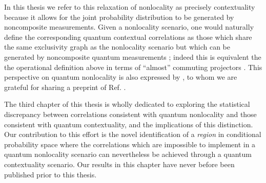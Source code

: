 \documentclass[
  12pt          %
  ,letterpaper  %
  ,center       %
  ,noupper      %
  ,english,fleqn]{uconnthesis}
\begin{document}
In this thesis we refer to this relaxation of nonlocality as precisely contextuality because it allows for the joint probability distribution to be generated by noncomposite measurements. Given a nonlocality scenario, one would naturally define the corresponding quantum contextual correlations as those which share the same exclusivity graph as the nonlocality scenario but which can be generated by noncomposite quantum measurements \cite[Proposition 6.3.1.d]{FritzCombinatorialLong}; indeed this is equivalent the the operational definition above in terms of ``almost'' commuting projectors \cite[Corollary 6.4.2]{FritzCombinatorialLong}. This perspective on quantum nonlocality is also expressed by \citet{CabelloMultigraph}, to whom we are grateful for sharing a preprint of Ref. \cite{CabelloMultigraph}.

The third chapter of this thesis is wholly dedicated to exploring the statistical discrepancy between correlations consistent with quantum nonlocality and those consistent with quantum contextuality, and the implications of this distinction. Our contribution to this effort is the novel identification of a \emph{region} in conditional probability space where the correlations which are impossible to implement in a quantum nonlocality scenario can nevertheless be achieved through a quantum contextuality scenario. Our results in this chapter have never before been published prior to this thesis.
\end{document}
